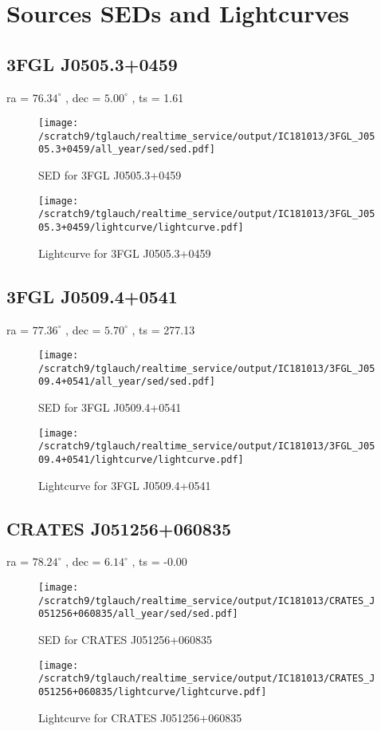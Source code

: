 \documentclass[a4paper]{article}
\begin{document}
\clearpage
\section{Sources SEDs and Lightcurves}
\subsection{3FGL J0505.3+0459}              ra = $76.34^\circ$ , dec = $5.00^\circ$ , ts = 1.61\begin{figure}[h!]
\centering
  \texttt{[image: /scratch9/tglauch/realtime\_service/output/IC181013/3FGL\_J0505.3+0459/all\_year/sed/sed.pdf]}
  \caption{SED for 3FGL J0505.3+0459}
\end{figure}
\begin{figure}[h!]
\centering
  \texttt{[image: /scratch9/tglauch/realtime\_service/output/IC181013/3FGL\_J0505.3+0459/lightcurve/lightcurve.pdf]}
  \caption{Lightcurve for 3FGL J0505.3+0459}
\end{figure}
\clearpage 
\subsection{3FGL J0509.4+0541}              ra = $77.36^\circ$ , dec = $5.70^\circ$ , ts = 277.13\begin{figure}[h!]
\centering
  \texttt{[image: /scratch9/tglauch/realtime\_service/output/IC181013/3FGL\_J0509.4+0541/all\_year/sed/sed.pdf]}
  \caption{SED for 3FGL J0509.4+0541}
\end{figure}
\begin{figure}[h!]
\centering
  \texttt{[image: /scratch9/tglauch/realtime\_service/output/IC181013/3FGL\_J0509.4+0541/lightcurve/lightcurve.pdf]}
  \caption{Lightcurve for 3FGL J0509.4+0541}
\end{figure}
\clearpage 
\subsection{CRATES J051256+060835}              ra = $78.24^\circ$ , dec = $6.14^\circ$ , ts = -0.00\begin{figure}[h!]
\centering
  \texttt{[image: /scratch9/tglauch/realtime\_service/output/IC181013/CRATES\_J051256+060835/all\_year/sed/sed.pdf]}
  \caption{SED for CRATES J051256+060835}
\end{figure}
\begin{figure}[h!]
\centering
  \texttt{[image: /scratch9/tglauch/realtime\_service/output/IC181013/CRATES\_J051256+060835/lightcurve/lightcurve.pdf]}
  \caption{Lightcurve for CRATES J051256+060835}
\end{figure}
\clearpage 
\end{document}
